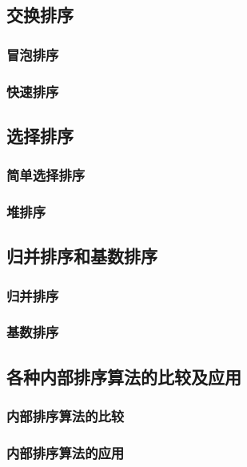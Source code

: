 \documentclass[12pt, a4paper, oneside]{ctexart}
\begin{document}
\subsection{交换排序}

\subsubsection{冒泡排序}

\subsubsection{快速排序}

\subsection{选择排序}

\subsubsection{简单选择排序}

\subsubsection{堆排序}

\subsection{归并排序和基数排序}

\subsubsection{归并排序}

\subsubsection{基数排序}

\subsection{各种内部排序算法的比较及应用}

\subsubsection{内部排序算法的比较}

\subsubsection{内部排序算法的应用}
\end{document}
